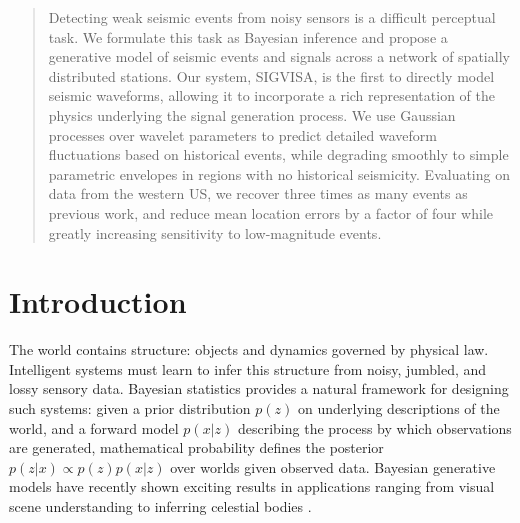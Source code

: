 \documentclass[twoside]{article} \usepackage{aistats2017}
\begin{document}
%

%




\begin{abstract}
  Detecting weak seismic events from noisy sensors is a difficult
  perceptual task. We formulate this task as Bayesian inference and
  propose a generative model of seismic events and signals across a
  network of spatially distributed stations. Our system, SIGVISA, is
  the first to directly model seismic waveforms, allowing it to
  incorporate a rich representation of the physics underlying the
  signal generation process. We use Gaussian processes over wavelet parameters to predict
  detailed waveform fluctuations based on historical events, while
  degrading smoothly to simple parametric envelopes in regions with no
  historical seismicity. Evaluating on data from the western US, we
  recover three times as many events as previous work, and reduce mean
  location errors by a factor of four while greatly increasing
  sensitivity to low-magnitude events.
\end{abstract}

\section{Introduction}

The world contains structure: objects and dynamics governed by
physical law. Intelligent systems must learn to infer this structure
from noisy, jumbled, and lossy sensory data. Bayesian statistics
provides a natural framework for designing such systems: given a prior distribution
$p(z)$ on underlying descriptions of the world, and a forward model $p(x|z)$
describing the process by which observations are generated,
mathematical probability defines the posterior $p(z|x) \propto p(z)p(x|z)$ over worlds
given observed data. Bayesian generative models have recently shown
exciting results in applications ranging from visual scene
understanding \citep{kulkarni2015picture,eslami2016attend} to
inferring celestial bodies \citep{regier2015celeste}.
\end{document}
